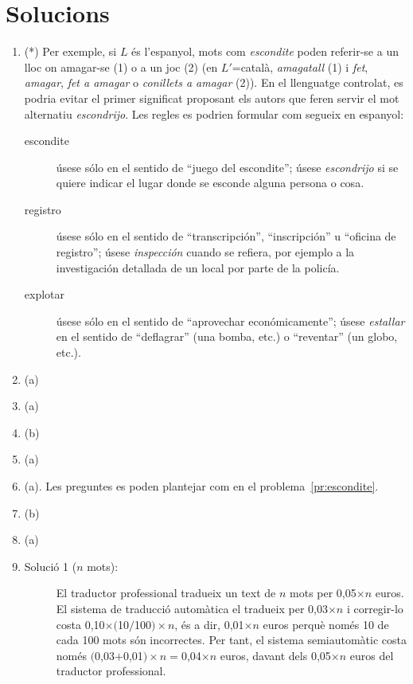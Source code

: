 \section{Solucions}
\begin{enumerate}
\item(*) \label{pr:escondite} Per exemple, si $L$ és l'espanyol, mots com {\em
    escondite} poden referir-se a un lloc on amagar-se (1) o a un
  joc (2) (en $L'$=català, \emph{amagatall} (1) i \emph{fet}, {\em
    amagar}, \emph{fet a amagar} o \emph{conillets a amagar}
  (2)). En el llenguatge controlat, es podria evitar el primer
  significat proposant els autors que feren servir el mot alternatiu {\em
    escondrijo}. Les regles es podrien formular com segueix en
  espanyol:

  {\sl
  \begin{description}
  \item[escondite] úsese sólo en el sentido de ``juego del
    escondite''; úsese \emph{escondrijo} si se quiere indicar el lugar
    donde se esconde alguna persona o cosa.
  \item[registro] úsese sólo en el sentido de ``transcripción'',
    ``inscripción'' u ``oficina de registro''; úsese \emph{inspección}
    cuando se refiera, por ejemplo a la investigación detallada de un
    local por parte de la policía.
  \item[explotar] úsese sólo en el sentido de ``aprovechar
    económicamente''; úsese \emph{estallar} en el sentido de
    ``deflagrar'' (una bomba, etc.) o ``reventar'' (un globo, etc.).
  \end{description}
}

\item (a)
\item (a)
\item (b)
\item (a)
\item (a). Les preguntes es poden plantejar com en el problema~\ref{pr:escondite}.
\item (b)
\item (a) 
\item
  \begin{description} 
  \item [Solució 1 ($n$ mots):] El traductor professional tradueix un
  text de $n$ mots per 0,05$\times n$ euros. El sistema de traducció
  automàtica el tradueix per 0,03$\times n$ i corregir-lo costa
  0,10$\times($10$/$100$)\times n$, és a dir, 0,01$\times n$ euros
  perquè només 10 de cada 100 mots són incorrectes. Per tant, el
  sistema semiautomàtic costa només $($0,03$+$0,01$)\times n =
  $0,04$\times n$ euros, davant dels 0,05$\times n$ euros del
  traductor professional.
 

\end{description}
\end{enumerate}
